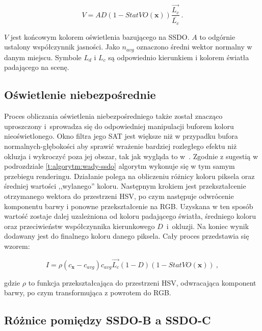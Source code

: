 		\begin{equation}
		V = AD(1 - StatVO(\mathbf{x})) \frac{\vec{L_{c}}}{\overline{L_{c}}}\ .
		\end{equation}
		
		\(V\) jest końcowym kolorem oświetlenia bazującego na SSDO. \(A\) to odgórnie ustalony współczynnik jasności. Jako \(n_{avg}\) oznaczono średni wektor normalny w danym miejscu. Symbole \(L_{d}\) i \(L_{c}\) są odpowiednio kierunkiem i kolorem światła padającego na scenę.
		
		\subsection{Oświetlenie niebezpośrednie}
		\label{t:algorytm:stat:indirect}
		
		Proces obliczania oświetlenia niebezpośredniego także został znacząco uproszczony i~sprowadza się do odpowiedniej manipulacji buforem koloru nieoświetlonego. Okno filtra jego SAT jest większe niż w przypadku bufora normalnych-głębokości aby sprawić wrażenie bardziej rozległego efektu niż okluzja i wykroczyć poza jej obszar, tak jak wygląda to w~\cite{ssdo}. Zgodnie z sugestią w podrozdziale \ref{t:algorytm:wady-ssdo} algorytm wykonuje się w tym samym przebiegu renderingu. Działanie polega na obliczeniu różnicy koloru piksela oraz średniej wartości ,,wylanego'' koloru. Następnym krokiem jest przekształcenie otrzymanego wektora do przestrzeni HSV, po czym następuje odwrócenie komponentu barwy i ponowne przekształcenie na RGB. Uzyskana w ten sposób wartość zostaje dalej uzależniona od koloru padającego światła, średniego koloru oraz przeciwieństw współczynnika kierunkowego \(D\)~i~okluzji. Na koniec wynik dodawany jest do finalnego koloru danego piksela. Cały proces przedstawia się wzorem:
		
		\begin{equation}
		I = \rho(c_{\mathbf{x}} - c_{avg})c_{avg}\vec{L_{c}}(1 - D)(1 - StatVO(\mathbf{x}))\ ,
		\end{equation}
		
		gdzie \(\rho\) to funkcja przekształcająca do przestrzeni HSV, odwracająca komponent barwy, po czym transformująca z powrotem do RGB.
		
		\subsection{Różnice pomiędzy SSDO-B a SSDO-C}
		\label{t:algorytm:stat:diffs}
		
